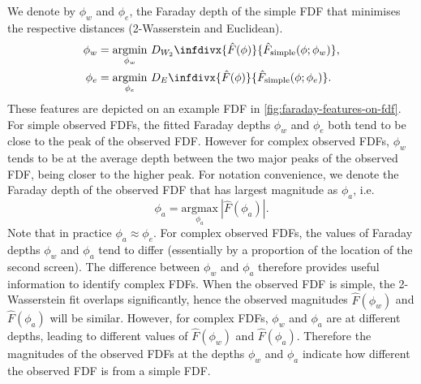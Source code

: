     We denote by $\phi_w$ and $\phi_e$, the Faraday depth of the simple FDF that minimises the respective distances
    (2-Wasserstein and Euclidean).
    \begin{align*}
       \phi_w &= \underset{\phi_w}{\mathrm{argmin}}\ D_{W_2}\infdivx{\hat F(\phi)}{\hat F_{\mathrm{simple}}(\phi; \phi_w)},\\
       \phi_e &= \underset{\phi_e}{\mathrm{argmin}}\ D_E\infdivx{\hat F(\phi)}{\hat F_{\mathrm{simple}}(\phi; \phi_e)}.
     \end{align*}
     These features are depicted on an example FDF in \autoref{fig:faraday-features-on-fdf}.
     For simple observed FDFs, the fitted Faraday depths $\phi_w$ and $\phi_e$ both tend to be
     close to the peak of the observed FDF. However for complex observed FDFs, $\phi_w$ tends
     to be at the average depth between the two major peaks of the observed FDF, being closer
     to the higher peak. For notation convenience, we denote the Faraday depth of the
     observed FDF that has largest magnitude as $\phi_a$, i.e.
     \begin{equation*}
       \phi_a = \underset{\phi_a}{\mathrm{argmax}}\ |\hat F(\phi_a)|.
     \end{equation*}
     Note that in practice $\phi_a \approx \phi_e$.
     For complex observed FDFs, the values of Faraday depths $\phi_w$ and $\phi_a$ tend
     to differ (essentially by a proportion of the location of the second screen).
     The difference between $\phi_w$ and $\phi_a$ therefore provides useful information
     to identify complex FDFs.
     When the observed FDF is simple, the 2-Wasserstein fit overlaps significantly,
     hence the observed magnitudes $\hat F(\phi_w)$ and $\hat F(\phi_a)$ will be similar.
     However, for complex FDFs, $\phi_w$ and $\phi_a$ are at different depths,
     leading to different values of $\hat F(\phi_w)$ and $\hat F(\phi_a)$.
     Therefore the magnitudes of the observed FDFs at the depths $\phi_w$ and $\phi_a$
     indicate how different the observed FDF is from a simple FDF.

